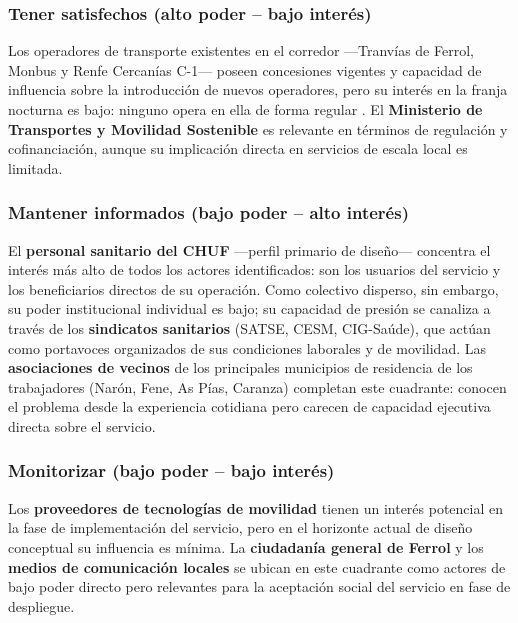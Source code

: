 \subsubsection{Tener satisfechos (alto poder -- bajo interés)}

Los operadores de transporte existentes en el corredor ---Tranvías de
Ferrol, Monbus y Renfe Cercanías C-1--- poseen concesiones vigentes y
capacidad de influencia sobre la introducción de nuevos operadores, pero
su interés en la franja nocturna es bajo: ninguno opera en ella de forma
regular \parencite{Alsaferrol2024horarios,RenfeCercaniasFerrol2026}. El
\textbf{Ministerio de Transportes y Movilidad Sostenible} es relevante
en términos de regulación y cofinanciación, aunque su implicación directa
en servicios de escala local es limitada.

\subsubsection{Mantener informados (bajo poder -- alto interés)}

El \textbf{personal sanitario del CHUF} ---perfil primario de diseño---
concentra el interés más alto de todos los actores identificados: son los
usuarios del servicio y los beneficiarios directos de su operación.
Como colectivo disperso, sin embargo, su poder institucional individual
es bajo; su capacidad de presión se canaliza a través de los
\textbf{sindicatos sanitarios} (SATSE, CESM, CIG-Saúde), que actúan como
portavoces organizados de sus condiciones laborales y de movilidad. Las
\textbf{asociaciones de vecinos} de los principales municipios de
residencia de los trabajadores (Narón, Fene, As Pías, Caranza)
\parencite{LouridoRegueira2026} completan este cuadrante: conocen el
problema desde la experiencia cotidiana pero carecen de capacidad
ejecutiva directa sobre el servicio.

\subsubsection{Monitorizar (bajo poder -- bajo interés)}

Los \textbf{proveedores de tecnologías de movilidad} tienen un interés
potencial en la fase de implementación del servicio, pero en el horizonte
actual de diseño conceptual su influencia es mínima. La
\textbf{ciudadanía general de Ferrol} y los \textbf{medios de
comunicación locales} se ubican en este cuadrante como actores de bajo
poder directo pero relevantes para la aceptación social del servicio en
fase de despliegue.

